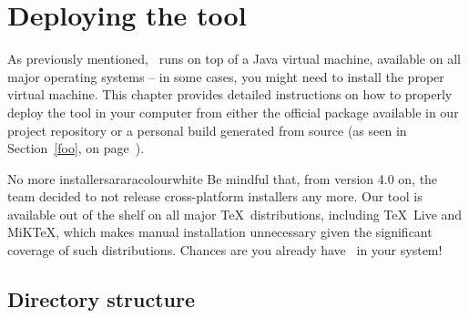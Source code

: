 \chapter{Deploying the tool}
\label{chap:deployingthetool}

As previously mentioned, \arara\ runs on top of a Java virtual machine, available on all major operating systems -- in some cases, you might need to install the proper virtual machine. This chapter provides detailed instructions on how to properly deploy the tool in your computer from either the official package available in our project repository or a personal build generated from source (as seen in Section~\ref{foo}, on page~\pageref{foo}).

\begin{messagebox}{No more installers}{araracolour}{\icok}{white}
Be mindful that, from version 4.0 on, the team decided to not release cross-platform installers any more. Our tool is available out of the shelf on all major \TeX\ distributions, including \TeX\ Live and MiK\TeX, which makes manual installation unnecessary given the significant coverage of such distributions. Chances are you already have \arara\ in your system!
\end{messagebox}

\section{Directory structure}
\label{sec:directorystructure}





